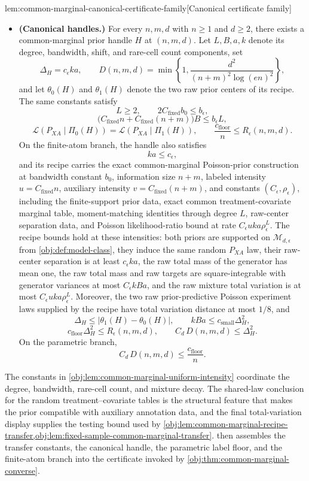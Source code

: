 \begin{lemmav}{lem:common-marginal-canonical-certificate-family}[Canonical certificate family]
\begin{itemize}
\item \textbf{(Canonical handles.)}
For every \(n,m,d\) with \(n\ge1\) and \(d\ge2\), there exists a common-marginal prior handle \(H\) at \((n,m,d)\).  Let \(L,B,a,k\) denote its degree, bandwidth, shift, and rare-cell count components, set
\[
\Delta_H=c_\epsilon ka,
\qquad
D(n,m,d)=\min\left\{1,\frac{d^2}{(n+m)^2\log(en)^2}\right\},
\]
and let \(\theta_0(H)\) and \(\theta_1(H)\) denote the two raw prior centers of its recipe.  The same constants satisfy
\[
L\ge2,
\qquad
2C_{\mathrm{fixed}}b_0\le b_\epsilon,
\]
\[
\bigl(C_{\mathrm{fixed}}n+C_{\mathrm{fixed}}(n+m)\bigr)B
\le
b_\epsilon L,
\]
\[
\mathcal L(P_{XA}\mid \Pi_0(H))
=
\mathcal L(P_{XA}\mid \Pi_1(H)),
\qquad
\frac{c_{\mathrm{floor}}}{n}\le R_\epsilon(n,m,d).
\]
On the finite-atom branch, the handle also satisfies
\[
ka\le c_\epsilon,
\]
and its recipe carries the exact common-marginal Poisson-prior construction at bandwidth constant \(b_0\), information size \(n+m\), labeled intensity \(u=C_{\mathrm{fixed}}n\), auxiliary intensity \(v=C_{\mathrm{fixed}}(n+m)\), and constants \((C_\epsilon,\rho_\epsilon)\), including the finite-support prior data, exact common treatment-covariate marginal table, moment-matching identities through degree \(L\), raw-center separation data, and Poisson likelihood-ratio bound at rate \(C_\epsilon u k a\rho_\epsilon^L\).  The recipe bounds hold at these intensities: both priors are supported on \(\mathcal M_{d,\epsilon}\) from \cref{obj:def:model-class}, they induce the same random \(P_{XA}\) law, their raw-center separation is at least \(c_\epsilon ka\), the raw total mass of the generator has mean one, the raw total mass and raw targets are square-integrable with generator variances at most \(C_\epsilon kBa\), and the raw mixture total variation is at most \(C_\epsilon u k a\rho_\epsilon^L\).  Moreover, the two raw prior-predictive Poisson experiment laws supplied by the recipe have total variation distance at most \(1/8\), and
\[
\Delta_H\le
\left|\theta_1(H)-\theta_0(H)\right|,
\qquad
kBa\le c_{\mathrm{small}}\Delta_H^2,
\]
\[
c_{\mathrm{floor}}\Delta_H^2\le R_\epsilon(n,m,d),
\qquad
C_d\,D(n,m,d)\le \Delta_H^2.
\]
On the parametric branch,
\[
C_d\,D(n,m,d)\le \frac{c_{\mathrm{floor}}}{n}.
\]
\end{itemize}
\end{lemmav}

The constants in \cref{obj:lem:common-marginal-uniform-intensity} coordinate the degree, bandwidth, rare-cell count, and mixture decay. The shared-law conclusion for the random treatment--covariate tables is the structural feature that makes the prior compatible with auxiliary annotation data, and the final total-variation display supplies the testing bound used by \cref{obj:lem:common-marginal-recipe-transfer,obj:lem:fixed-sample-common-marginal-transfer}.  then assembles the transfer constants, the canonical handle, the parametric label floor, and the finite-atom branch into the certificate invoked by \cref{obj:thm:common-marginal-converse}.

